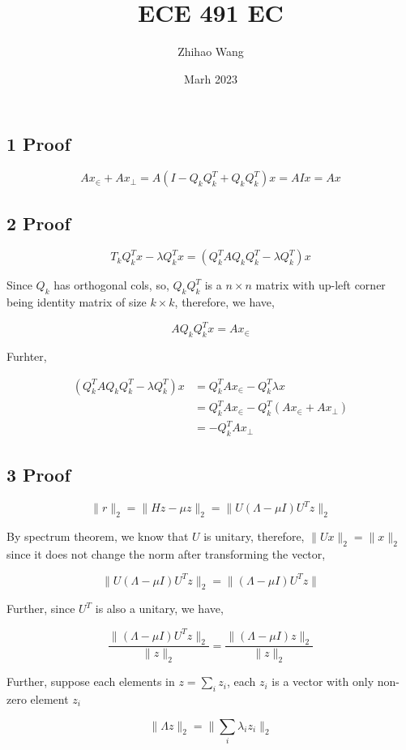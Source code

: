 \documentclass{article}
\title{ECE 491 EC}
\author{Zhihao Wang}
\date{Marh 2023}
\begin{document}
\maketitle

\subsection*{1 Proof}

$$Ax_{\in} + Ax_{\bot} = A(I - Q_kQ^T_k + Q_kQ^T_k)x = AIx = Ax$$

\subsection*{2 Proof}

$$T_k Q_k^Tx - \lambda Q_k^T x = (Q_k^TAQ_kQ_k^T - \lambda Q_k^T)x $$

Since $Q_k$ has orthogonal cols, so, $Q_kQ_k^T$ is a $n \times n$ matrix with up-left corner being identity matrix of size $k \times k$, therefore, we have,

$$AQ_kQ_k^Tx = A x_{\in}$$ 

Furhter, 

\[
\begin{split}
(Q_k^TAQ_kQ_k^T- \lambda Q_k^T)x &= Q_k^TAx_{\in}- Q_k^T \lambda x \\
&= Q_k^TAx_{\in}- Q_k^T (Ax_{\in} + Ax_{\bot})\\
&= -Q_k^TAx_{\bot}
\end{split}
\]

\subsection*{3 Proof}

$$\|r \|_2 = \| Hz - \mu z\|_2 = \|U(\Lambda - \mu I)U^T z\|_2$$

By spectrum theorem, we know that $U$ is unitary, therefore, 
$\| Ux\|_2 = \| x\|_2$ since it does not change the norm after transforming the vector,

$$\|U(\Lambda - \mu I)U^T z\|_2 = \| (\Lambda - \mu I)U^T z\|$$

Further, since $U^T$ is also a unitary, we have,

$$\frac{\| (\Lambda - \mu I)U^T z\|_2}{\| z\|_2} = \frac{\| (\Lambda - \mu I) z\|_2}{\| z\|_2}$$

Further, suppose each elements in $z  = \sum_i z_i$, each $z_i$ is a vector with only non-zero element $z_i$

$$\|\Lambda z\|_2 = \|\sum_i \lambda_i z_i\|_2$$
\end{document}
